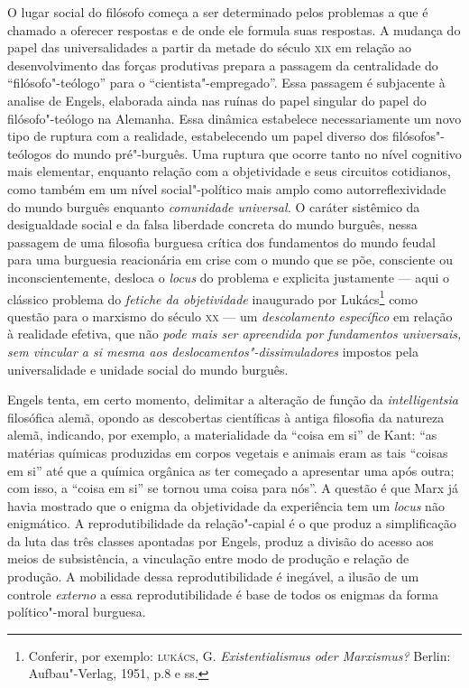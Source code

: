 O lugar social do filósofo começa a ser determinado pelos problemas a
que é chamado a oferecer respostas e de onde ele formula suas respostas.
A mudança do papel das universalidades a partir da metade do século
\textsc{xix} em relação ao desenvolvimento das forças produtivas prepara
a passagem da centralidade do ``filósofo"-teólogo'' para o
``cientista"-empregado''. Essa passagem é subjacente à analise de
Engels, elaborada ainda nas ruínas do papel singular do papel do
filósofo"-teólogo na Alemanha. Essa dinâmica estabelece necessariamente
um novo tipo de ruptura com a realidade, estabelecendo um papel diverso
dos filósofos"-teólogos do mundo pré"-burguês. Uma ruptura que ocorre
tanto no nível cognitivo mais elementar, enquanto relação com a
objetividade e seus circuitos cotidianos, como também em um nível
social"-político mais amplo como autorreflexividade do mundo burguês
enquanto \emph{comunidade universal.} O caráter sistêmico da
desigualdade social e da falsa liberdade concreta do mundo burguês,
nessa passagem de uma filosofia burguesa crítica dos fundamentos do
mundo feudal para uma burguesia reacionária em crise com o mundo que se
põe, consciente ou inconscientemente, desloca o \emph{locus} do problema
e explicita justamente --- aqui o clássico problema do \emph{fetiche da
objetividade} inaugurado por Lukács\footnote{Conferir, por exemplo:
  \textsc{lukács}, G. \emph{Existentialismus oder Marxismus?} Berlin:
  Aufbau"-Verlag, 1951, p.8 e ss.} como questão para o marxismo do
século \textsc{xx} --- um \emph{descolamento específico} em relação à
realidade efetiva, que não \emph{pode mais ser apreendida por
fundamentos universais, sem vincular a si mesma aos
deslocamentos"-dissimuladores} impostos pela universalidade e unidade
social do mundo burguês.

Engels tenta, em certo momento, delimitar a alteração de função da
\emph{intelligentsia} filosófica alemã, opondo as descobertas
científicas à antiga filosofia da natureza alemã, indicando, por
exemplo, a materialidade da ``coisa em si'' de Kant: ``as matérias
químicas produzidas em corpos vegetais e animais eram as tais ``coisas
em si'' até que a química orgânica as ter começado a apresentar uma após
outra; com isso, a ``coisa em si'' se tornou uma coisa para nós''. A
questão é que Marx já havia mostrado que o enigma da objetividade da
experiência tem um \emph{locus} não enigmático. A reprodutibilidade da
relação"-capial é o que produz a simplificação da luta das três classes
apontadas por Engels, produz a divisão do acesso aos meios de
subsistência, a vinculação entre modo de produção e relação de produção.
A mobilidade dessa reprodutibilidade é inegável, a ilusão de um controle
\emph{externo} a essa reprodutibilidade é base de todos os enigmas da
forma político"-moral burguesa.

